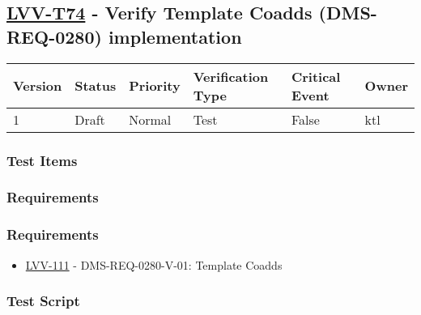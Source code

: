 \hypertarget{lvv-t74---verify-template-coadds-dms-req-0280-implementation}{%
\subsection{\texorpdfstring{\href{https://jira.lsstcorp.org/secure/Tests.jspa\#/testCase/LVV-T74}{LVV-T74}
- Verify Template Coadds (DMS-REQ-0280)
implementation}{LVV-T74 - Verify Template Coadds (DMS-REQ-0280) implementation}}\label{lvv-t74---verify-template-coadds-dms-req-0280-implementation}}

\begin{longtable}[]{@{}llllll@{}}
\toprule
Version & Status & Priority & Verification Type & Critical Event &
Owner\tabularnewline
\midrule
\endhead
1 & Draft & Normal & Test & False & ktl\tabularnewline
\bottomrule
\end{longtable}

\hypertarget{test-items-11}{%
\subsubsection{Test Items}\label{test-items-11}}

\hypertarget{requirements-22}{%
\subsubsection{Requirements}\label{requirements-22}}

\hypertarget{requirements-23}{%
\subsubsection{Requirements}\label{requirements-23}}

\begin{itemize}
\tightlist
\item
  \href{https://jira.lsstcorp.org/browse/LVV-111}{LVV-111} -
  DMS-REQ-0280-V-01: Template Coadds
\end{itemize}

\hypertarget{test-script-11}{%
\subsubsection{Test Script}\label{test-script-11}}

